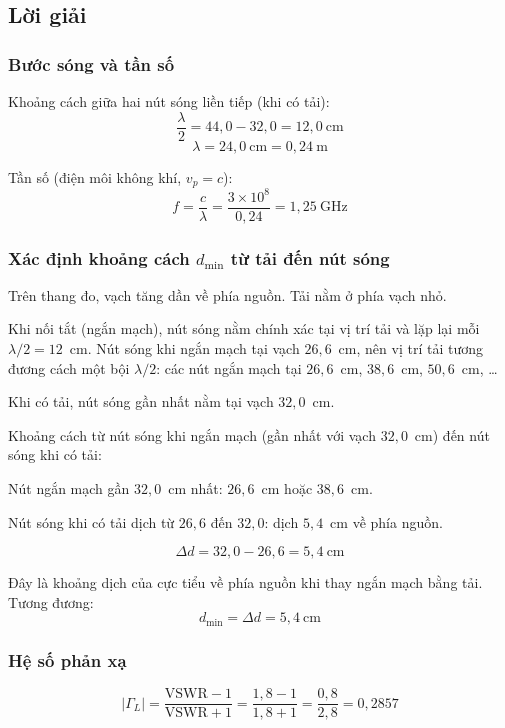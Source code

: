 \documentclass[12pt,a4paper]{article}
\begin{document}
\subsection{Lời giải}

\subsubsection{Bước sóng và tần số}

Khoảng cách giữa hai nút sóng liền tiếp (khi có tải):
\[
\frac{\lambda}{2} = 44{,}0 - 32{,}0 = 12{,}0~\text{cm}
\]
\[
\boxed{\lambda = 24{,}0~\text{cm} = 0{,}24~\text{m}}
\]

Tần số (điện môi không khí, $v_p = c$):
\[
\boxed{f = \frac{c}{\lambda} = \frac{3 \times 10^8}{0{,}24} = 1{,}25~\text{GHz}}
\]

\subsubsection{Xác định khoảng cách $d_{\min}$ từ tải đến nút sóng}

Trên thang đo, vạch tăng dần về phía nguồn. Tải nằm ở phía vạch nhỏ.

Khi nối tắt (ngắn mạch), nút sóng nằm chính xác tại vị trí tải và lặp lại mỗi $\lambda/2 = 12$~cm. Nút sóng khi ngắn mạch tại vạch $26{,}6$~cm, nên vị trí tải tương đương cách một bội $\lambda/2$: các nút ngắn mạch tại $26{,}6$~cm, $38{,}6$~cm, $50{,}6$~cm, \ldots

Khi có tải, nút sóng gần nhất nằm tại vạch $32{,}0$~cm.

Khoảng cách từ nút sóng khi ngắn mạch (gần nhất với vạch $32{,}0$~cm) đến nút sóng khi có tải:

Nút ngắn mạch gần $32{,}0$~cm nhất: $26{,}6$~cm hoặc $38{,}6$~cm.

Nút sóng khi có tải dịch từ $26{,}6$ đến $32{,}0$: dịch $5{,}4$~cm về phía nguồn.

\[
\Delta d = 32{,}0 - 26{,}6 = 5{,}4~\text{cm}
\]

Đây là khoảng dịch của cực tiểu về phía nguồn khi thay ngắn mạch bằng tải. Tương đương:
\[
d_{\min} = \Delta d = 5{,}4~\text{cm}
\]

\subsubsection{Hệ số phản xạ}

\[
|\Gamma_L| = \frac{\text{VSWR} - 1}{\text{VSWR} + 1} = \frac{1{,}8 - 1}{1{,}8 + 1} = \frac{0{,}8}{2{,}8} = 0{,}2857
\]
\end{document}

